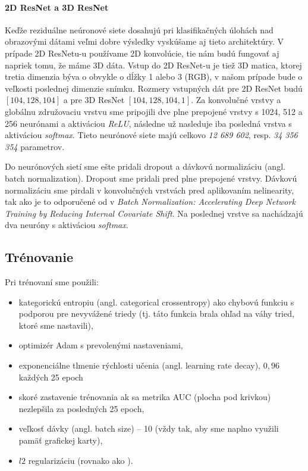 \paragraph{2D ResNet a 3D ResNet} Keďže reziduálne neúronové siete dosahujú pri klasifikačných úlohách nad obrazovými dátami veľmi dobre výsledky vyskúšame aj tieto architektúry. V prípade 2D ResNetu-u používame 2D konvolúcie, tie nám budú fungovať aj napriek tomu, že máme 3D dáta. Vstup do 2D ResNet-u je tiež 3D matica, ktorej tretia dimenzia býva o obvykle o dĺžky 1 alebo 3 (RGB), v našom prípade bude o veľkosti poslednej dimenzie snímku. Rozmery vstupných dát pre 2D ResNet budú $[104, 128, 104]$ a pre 3D ResNet $[104, 128, 104, 1]$. Za konvolučné vrstvy a globálnu združovaciu vrstvu sme pripojili dve plne prepojené vrstvy s 1024, 512 a 256 neurónami a aktiváciou \textit{ReLU}, následne už nasleduje iba posledná vrstva s aktiváciou \textit{softmax}. Tieto neurónové siete majú celkovo \textit{12 689 602}, resp. \textit{34 356 354} parametrov.

Do neurónových sietí sme ešte pridali dropout a dávkovú normalizáciu (angl. batch normalization). Dropout sme pridali pred plne prepojené vrstvy. Dávkovú normalizáciu sme pirdali v konvolučných vrstvách pred aplikovaním nelinearity, tak ako je to odporučené od \citeauthor*{ioffe2015batch} v \textit{Batch Normalization: Accelerating Deep Network Training by Reducing Internal Covariate Shift}. Na poslednej vrstve sa nachádzajú dva neuróny s aktiváciou \textit{softmax}.

\subsection{Trénovanie}

Pri trénovaní sme použili:

\begin{itemize}
    \item kategorickú entropiu (angl. categorical crossentropy) ako chybovú funkciu s podporou pre nevyvážené triedy (tj. táto funkcia brala ohľad na váhy tried, ktoré sme nastavili),
    \item optimizér Adam s prevolenými nastaveniami,
    \item exponenciálne tlmenie rýchlosti učenia (angl. learning rate decay), $0,96$ každých 25 epoch
    \item skoré zastavenie trénovania ak sa metrika AUC (plocha pod krivkou) nezlepšila za posledných 25 epoch,
    \item veľkosť dávky (angl. batch size) -- 10 (vždy tak, aby sme naplno využili pamäť grafickej karty),
    \item $l2$ regularizáciu (rovnako ako \citeauthor*{esmaeilzadeh2018end}).
\end{itemize}

